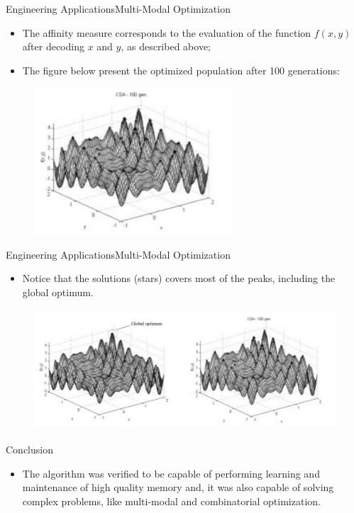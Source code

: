 \begin{frame}{Engineering Applications}{Multi-Modal Optimization}
\begin{itemize}
\item{The affinity measure corresponds to the evaluation of the
function \begin{math} f(x, y) \end{math} after decoding \begin{math} x \end{math} and \begin{math} y \end{math}, as described above;}
\item{The figure below present the  optimized population after 100
generations:}
\end{itemize}
\begin{figure}[h]
\centering
\includegraphics[height=5.5cm]{img/cj_func_maxi_100.png}
\end{figure}
\end{frame}

\begin{frame}{Engineering Applications}{Multi-Modal Optimization}
\begin{itemize}
\item{Notice that the solutions (stars) covers most of the peaks, including the global optimum. }
\end{itemize}
\begin{figure}[h]
\centering
\includegraphics[height=4.5cm]{img/cj_func_and.png}
\end{figure}
\end{frame}


\begin{frame}{Conclusion}
\begin{itemize}
\item{The algorithm was verified to be capable of performing learning and maintenance of high quality memory and, it was also capable of solving complex problems, like multi-modal and combinatorial optimization.}
\end{itemize}

\end{frame}

